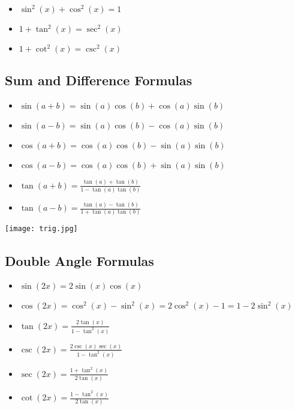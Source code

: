 \begin{itemize}

    \item \( \sin^2(x) + \cos^2(x) = 1 \)

    \item \( 1 + \tan^2(x) = \sec^2(x) \)

    \item \( 1 + \cot^2(x) = \csc^2(x) \)

\end{itemize}

\subsection{Sum and Difference Formulas}

\begin{itemize}

    \item \( \sin(a + b) = \sin(a)\cos(b) + \cos(a)\sin(b) \)

    \item \( \sin(a - b) = \sin(a)\cos(b) - \cos(a)\sin(b) \)

    \item \( \cos(a + b) = \cos(a)\cos(b) - \sin(a)\sin(b) \)

    \item \( \cos(a - b) = \cos(a)\cos(b) + \sin(a)\sin(b) \)

    \item \( \tan(a + b) = \frac{\tan(a) + \tan(b)}{1 - \tan(a)\tan(b)}\)

    \item \( \tan(a - b) = \frac{\tan(a) - \tan(b)}{1 + \tan(a)\tan(b)}\)
\end{itemize}

\begin{center}
\texttt{[image: trig.jpg]}
\end{center}

\subsection{Double Angle Formulas}

\begin{itemize}

    \item \( \sin(2x) = 2\sin(x)\cos(x) \)

    \item \( \cos(2x) = \cos^2(x) - \sin^2(x) = 2\cos^2(x) - 1 = 1 - 2\sin^2(x) \)

    \item \( \tan(2x) = \frac{2\tan(x)}{1 - \tan^2(x)}\)

    \item \( \csc(2x) = \frac{2\csc(x)\sec(x)}{1 - \tan^2(x)}\)

    \item \( \sec(2x) = \frac{1 + \tan^2(x)}{2\tan(x)}\)

    \item \( \cot(2x) = \frac{1 - \tan^2(x)}{2\tan(x)}\)

\end{itemize}

